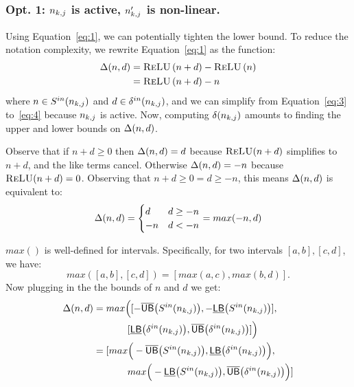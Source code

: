 \subsubsection{Opt. 1: $ n_{k,j} $ is active, $ n'_{k,j} $ is non-linear.}
\label{sec:opt1}
Using Equation~\ref{eq:1}, we can potentially tighten the
lower bound. To reduce the notation complexity, we rewrite Equation~\ref{eq:1} as the function:
\begin{align}
\Delta(n, d) & = \textsc{ReLU}\left(n + d\right) - \textsc{ReLU}\left(n\right) \label{eq:3}\\
        & = \textsc{ReLU}\left(n + d\right) - n \label{eq:4}
\end{align}
where $n \in S^{in}(n_{k,j})$ and $d \in \delta^{in}(n_{k,j})$, and we can simplify
from Equation~\ref{eq:3} to~\ref{eq:4} because $ n_{k,j} $ is active. Now, computing
$ \delta(n_{k,j}) $ amounts to finding the upper and lower bounds on $ \Delta(n,d) $.

Observe that if $ n + d \geq 0 $ then $ \Delta(n, d) = d $ because $ \textsc{ReLU}(n + d)$
simplifies to $ n + d $, and the like terms cancel.
Otherwise $ \Delta(n, d) = -n$ because $ \textsc{ReLU}(n + d) = 0 $.
Observing that $ n + d \geq 0 = d \geq -n $, this means $ \Delta(n,d) $
is equivalent to:
\[
\Delta(n, d) = \begin{cases}
d & d \geq -n\\
-n & d < -n
\end{cases} = max(-n, d)
\]

$ max() $ is well-defined for intervals.
Specifically, for two intervals $ [a,b], [c,d] $, we have:
\[
	max([a,b], [c,d]) = [max(a, c), max(b, d)].
\]
Now plugging in the the bounds of $ n $ and $ d $ we get:
\begin{align*}
\Delta(n,d) & = max\Big( [-\overline{\mathsf{UB}}\big(S^{in}(n_{k,j})\big), -\underline{\mathsf{LB}}\big(S^{in}(n_{k,j})\big)], \\
& \qquad \quad \;\; [\underline{\mathsf{LB}}\big(\delta^{in}(n_{k,j})\big), \overline{\mathsf{UB}}\big(\delta^{in}(n_{k,j})\big)]\Big)\\
 & = [max\Big(-\overline{\mathsf{UB}}\big(S^{in}(n_{k,j})\big), \underline{\mathsf{LB}}\big(\delta^{in}(n_{k,j})\big) \Big),  \\
& \qquad \quad \;\; max\Big(-\underline{\mathsf{LB}}\big(S^{in}(n_{k,j})\big), \overline{\mathsf{UB}}\big(\delta^{in}(n_{k,j})\big)\Big)]
\end{align*}


